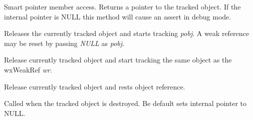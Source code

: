 Smart pointer member access. Returns a pointer to the
tracked object. If the internal pointer is NULL this
method will cause an assert in debug mode.


\label{wxweakrefoperatorassign}


Releases the currently tracked object and starts tracking {\it pobj}.
A weak reference may be reset by passing {\it NULL} as {\it pobj}.


\label{wxweakrefoperatorassign2}


Release currently tracked object and start tracking the same object as
the wxWeakRef {\it wr}.


\label{wxweakrefrelease}


Release currently tracked object and rests object reference.


\label{wxweakrefonobjectdestroy}


Called when the tracked object is destroyed. Be default sets
internal pointer to NULL.

